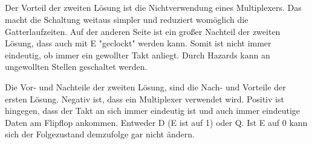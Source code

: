 \documentclass[10pt,a4paper,oneside,ngerman,numbers=noenddot]{scrartcl}
\begin{document}
\subsection{} %
Der Vorteil der zweiten Lösung ist die Nichtverwendung eines Multiplexers. Das macht die Schaltung weitaus simpler und reduziert womöglich die Gatterlaufzeiten.
Auf der anderen Seite ist ein großer Nachteil der zweiten Lösung, dass auch mit E "geclockt" werden kann. Somit ist nicht immer eindeutig, ob immer ein gewollter Takt anliegt.
Durch Hazards kann an ungewollten Stellen geschaltet werden.

Die Vor- und Nachteile der zweiten Lösung, sind die Nach- und Vorteile der ersten Lösung. Negativ ist, dass ein Multiplexer verwendet wird. Positiv ist hingegen, dass der Takt an sich immer eindeutig ist und auch immer eindeutige Daten am Flipflop ankommen. Entweder D (E ist auf 1) oder Q. Ist E auf 0 kann sich der Folgezustand demzufolge gar nicht ändern.
\section{} %
\end{document}
